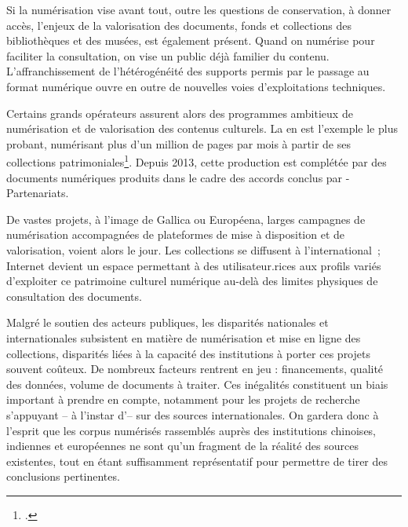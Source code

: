 Si la numérisation vise avant tout, outre les questions de conservation, à donner accès, l'enjeux de la
valorisation des documents, fonds et collections des bibliothèques et
des musées, est également présent. Quand on numérise pour faciliter la
consultation, on vise un public déjà familier du contenu.
L'affranchissement de l'hétérogénéité des supports permis par le passage
au format numérique ouvre en outre de nouvelles voies d'exploitations
techniques.

Certains grands opérateurs assurent alors des programmes ambitieux de
numérisation et de valorisation des contenus culturels. La \bnf en est
l'exemple le plus probant, numérisant plus d'un million de pages par
mois à partir de ses collections patrimoniales\footcite{noauthor_numerisation_nodate}. Depuis
2013, cette production est complétée par des documents numériques
produits dans le cadre des accords conclus par \bnf-Partenariats.

De vastes projets, à l'image de Gallica ou Européena, larges campagnes
de numérisation accompagnées de plateformes de mise à disposition et de
valorisation, voient alors le jour. Les collections se diffusent à
l'international~; Internet devient un espace permettant à des
utilisateur.rices aux profils variés d'exploiter ce patrimoine culturel
numérique au-delà des limites physiques de consultation des documents.

Malgré le soutien des acteurs publiques, les disparités nationales et
internationales subsistent en matière de numérisation et mise en ligne
des collections, disparités liées à la capacité des institutions à
porter ces projets souvent coûteux. De nombreux facteurs rentrent en jeu
: financements, qualité des données, volume de documents à traiter. Ces
inégalités constituent un biais important à prendre en compte, notamment
pour les projets de recherche s'appuyant -- à l'instar d'\eida -- sur des
sources internationales. On gardera donc à l'esprit que les corpus
numérisés rassemblés auprès des institutions chinoises, indiennes et
européennes ne sont qu'un fragment de la réalité des sources existentes,
tout en étant suffisamment représentatif pour permettre de tirer des
conclusions pertinentes.


